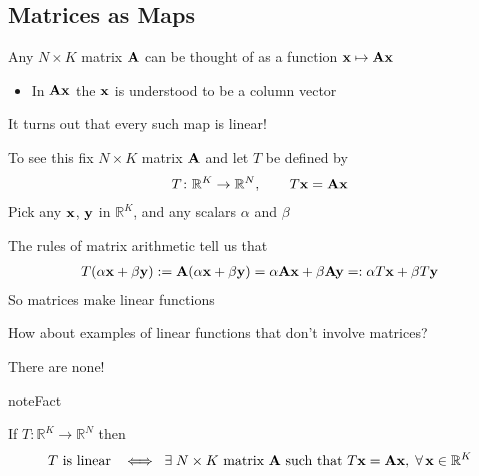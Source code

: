 \documentclass[letterpaper,10pt,english]{jupyterBook}
\begin{document}
\subsection{Matrices as Maps}
\label{\detokenize{05.linear_algebra:matrices-as-maps}}
\sphinxAtStartPar
Any \(N \times K\) matrix \({\bf A}\) can be thought of as a function
\({\bf x} \mapsto {\bf A} {\bf x}\)
\begin{itemize}
\item {} 
\sphinxAtStartPar
In \({\bf A} {\bf x}\) the \({\bf x}\) is understood to be
a column vector

\end{itemize}

\sphinxAtStartPar
It turns out that every such map is linear!

\sphinxAtStartPar
To see this fix \(N \times K\) matrix \({\bf A}\) and let \(T\) be defined by
\begin{equation*}
\begin{split}
%
T \colon \mathbb{R}^K \to \mathbb{R}^N, 
\qquad
T{\bf x} = {\bf A} {\bf x}
%
\end{split}
\end{equation*}
\sphinxAtStartPar
Pick any \({\bf x}\), \({\bf y}\) in \(\mathbb{R}^K\), and any scalars \(\alpha\) and \(\beta\)

\sphinxAtStartPar
The rules of matrix arithmetic tell us that
\begin{equation*}
\begin{split}
%
T(\alpha {\bf x} + \beta {\bf y}) 
:= {\bf A} (\alpha {\bf x} + \beta {\bf y})
= \alpha {\bf A} {\bf x} + \beta {\bf A} {\bf y}
=: \alpha T{\bf x} + \beta T{\bf y} 
%
\end{split}
\end{equation*}
\sphinxAtStartPar
So matrices make linear functions

\sphinxAtStartPar
How about examples of linear functions that don’t involve matrices?

\sphinxAtStartPar
There are none!

\begin{sphinxadmonition}{note}{Fact}

\sphinxAtStartPar
If \(T \colon \mathbb{R}^K \to \mathbb{R}^N\) then
\begin{equation*}
\begin{split}
T \text{ is linear }
\; \iff \;
\exists \; N \times K \text{ matrix } {\bf A} \text{ such that } T{\bf x} = {\bf A} {\bf x}, 
\;\forall \, {\bf x} \in \mathbb{R}^K
\end{split}
\end{equation*}\end{sphinxadmonition}
\end{document}
